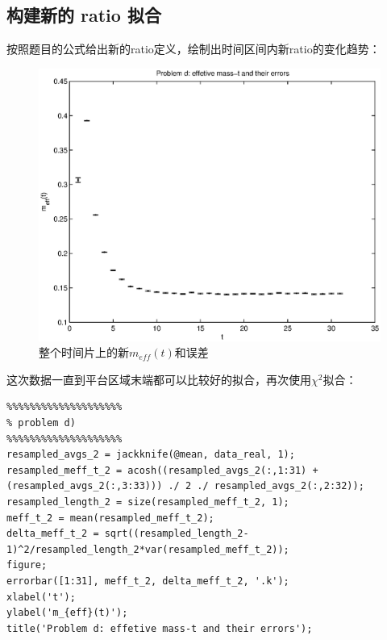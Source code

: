 \documentclass[paper=a4, fontsize=11pt]{scrartcl} %
\numberwithin{equation}{section} %
\numberwithin{figure}{section} %
\numberwithin{table}{section} %
\begin{document}
\begin{CJK*}{UTF8}{gbsn}
\subsection{构建新的 ratio 拟合}
按照题目的公式给出新的ratio定义，绘制出时间区间内新ratio的变化趋势：
\begin{figure}[H]
\centering
\includegraphics[width=140mm]{problem3_d_1.eps}
\caption{整个时间片上的新$m_{eff}(t)$和误差}
\end{figure}
这次数据一直到平台区域末端都可以比较好的拟合，再次使用$\chi^2$拟合：
\lstset{language=MATLAB}
\begin{lstlisting}
%%%%%%%%%%%%%%%%%%%%
% problem d)
%%%%%%%%%%%%%%%%%%%%
resampled_avgs_2 = jackknife(@mean, data_real, 1);
resampled_meff_t_2 = acosh((resampled_avgs_2(:,1:31) + (resampled_avgs_2(:,3:33))) ./ 2 ./ resampled_avgs_2(:,2:32));
resampled_length_2 = size(resampled_meff_t_2, 1);
meff_t_2 = mean(resampled_meff_t_2);
delta_meff_t_2 = sqrt((resampled_length_2-1)^2/resampled_length_2*var(resampled_meff_t_2));
figure;
errorbar([1:31], meff_t_2, delta_meff_t_2, '.k');
xlabel('t');
ylabel('m_{eff}(t)');
title('Problem d: effetive mass-t and their errors');


\end{lstlisting}
\end{CJK*}
\end{document}
